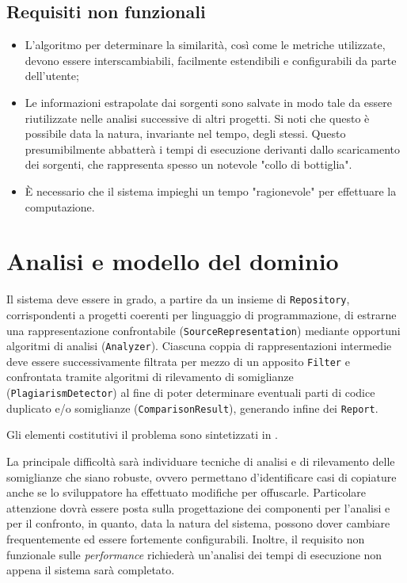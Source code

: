 \subsection*{Requisiti non funzionali}
\begin{itemize}
    \item L'algoritmo per determinare la similarità, così come le metriche utilizzate, devono essere interscambiabili, facilmente estendibili e configurabili da parte dell'utente;

    \item Le informazioni estrapolate dai sorgenti sono salvate in modo tale da essere riutilizzate nelle analisi successive di altri progetti. 
    Si noti che questo è possibile data la natura, invariante nel tempo, degli stessi.
    Questo presumibilmente abbatterà i tempi di esecuzione derivanti dallo scaricamento dei sorgenti, che rappresenta spesso un notevole "collo di bottiglia".

    \item \`E necessario che il sistema impieghi un tempo "ragionevole" per effettuare la computazione.
\end{itemize}

\section{Analisi e modello del dominio}
Il sistema deve essere in grado, a partire da un insieme di \texttt{Repository}, corrispondenti a progetti coerenti per linguaggio di programmazione, di estrarne una rappresentazione confrontabile (\texttt{SourceRepresentation}) mediante opportuni algoritmi di analisi (\texttt{Analyzer}).
%
Ciascuna coppia di rappresentazioni intermedie deve essere successivamente filtrata per mezzo di un apposito \texttt{Filter} e confrontata tramite algoritmi di rilevamento di somiglianze (\texttt{PlagiarismDetector}) al fine di poter determinare eventuali parti di codice duplicato e/o somiglianze (\texttt{ComparisonResult}), generando infine dei \texttt{Report}.

Gli elementi costitutivi il problema sono sintetizzati in .

La principale difficoltà sarà individuare tecniche di analisi e di rilevamento delle somiglianze che siano robuste, ovvero permettano d'identificare casi di copiature anche se lo sviluppatore ha effettuato modifiche per offuscarle.
%
Particolare attenzione dovrà essere posta sulla progettazione dei componenti per l'analisi e per il confronto, in quanto, data la natura del sistema, possono dover cambiare frequentemente ed essere fortemente configurabili.
%
Inoltre, il requisito non funzionale sulle \textit{performance} richiederà un'analisi dei tempi di esecuzione non appena il sistema sarà completato.

